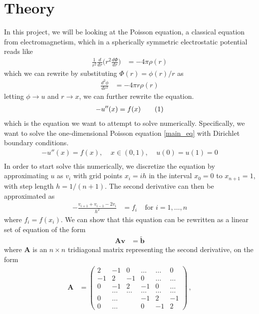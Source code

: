 \documentclass{article}
\newcommand\numberthis{\addtocounter{equation}{1}\tag{\theequation}}
\newcommand\ppmat[1]{\begin{pmatrix}#1\end{pmatrix}}
\begin{document}
\section{Theory}
In this project, we will be looking at the Poisson equation, a classical equation from electromagnetism, which in a spherically symmetric electrostatic potential reads like
\begin{align*}
  \frac{1}{r^2}\frac{d}{dr}\bigg(r^2\frac{d\Phi}{dr}\bigg) &= -4\pi\rho(r)
\end{align*}
which we can rewrite by substituting $\Phi(r) = \phi(r)/r$ as
\begin{align*}
  \frac{d^2\phi}{dr^2} &= -4\pi r\rho(r)
\end{align*}
letting $\phi\rightarrow u$ and $r \rightarrow x$, we can further rewrite the equation.
\begin{align*}
  -u''(x) = f(x) \numberthis\label{main_eq}
\end{align*}
which is the equation we want to attempt to solve numerically. Specifically, we want to solve the one-dimensional Poisson equation \eqref{main_eq} with Dirichlet boundary conditions.
\begin{align*}
  -u''(x) = f(x),\;\;\;\;x\in(0,1),\;\;\;\;u(0) = u(1) = 0\\
\end{align*}
In order to start solve this numerically, we discretize the equation by approximating $u$ as $v_i$ with grid points $x_i = ih$ in the interval $x_0 = 0$ to $x_{n+1}=1$, with step length $h = 1/(n+1)$. The second derivative can then be approximated as
\begin{align*}
  -\frac{v_{i+1}+v_{i-1}-2v_i}{h^2} &= f_i\;\;\;\;\text{for }i=1,\dots,n
\end{align*}
where $f_i = f(x_i)$. We can show that this equation can be rewritten as a linear set of equation of the form
\begin{align*}
  \mathbf{A}\mathbf{v} &= \mathbf{\tilde b}
\end{align*}
where $\mathbf{A}$ is an $n\times n$ tridiagonal matrix representing the second derivative, on the form
\begin{align*}
\mathbf{A} &= \ppmat{2&-1&0&\dots&\dots&0\\-1&2&-1&0&\dots&\dots\\0&-1&2&-1&0&\dots\\&\dots&\dots&\dots&\dots&\dots\\0&\dots& &-1&2&-1\\
0&\dots& &0&-1&2}\,,
\end{align*}
\end{document}
